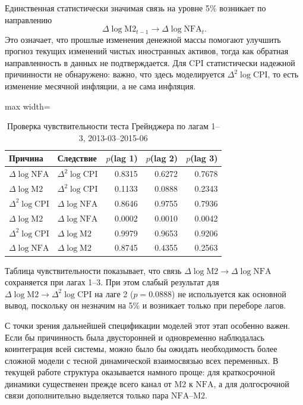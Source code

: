 \documentclass[12pt,a4paper]{article}
\begin{document}
Единственная статистически значимая связь на уровне 5\% возникает по направлению
\[
\Delta \log \mathrm{M2}_{t-1} \longrightarrow \Delta \log \mathrm{NFA}_t.
\]
Это означает, что прошлые изменения денежной массы помогают улучшить прогноз текущих
изменений чистых иностранных активов, тогда как обратная направленность в данных не
подтверждается. Для CPI статистически надежной причинности не обнаружено: важно, что здесь
моделируется $\Delta^2 \log \mathrm{CPI}$, то есть изменение месячной инфляции, а не сама
инфляция.

\begin{table}[H]
\centering
\caption{Проверка чувствительности теста Грейнджера по лагам 1--3, 2013-03--2015-06}
\small
\begin{adjustbox}{max width=\textwidth}
\begin{tabular}{llrrr}
\toprule
Причина & Следствие & $p$(lag 1) & $p$(lag 2) & $p$(lag 3) \\
\midrule
$\Delta \log \mathrm{NFA}$ & $\Delta^2 \log \mathrm{CPI}$ & 0.8315 & 0.6272 & 0.7678 \\
$\Delta \log \mathrm{M2}$ & $\Delta^2 \log \mathrm{CPI}$ & 0.1133 & 0.0888 & 0.2343 \\
$\Delta^2 \log \mathrm{CPI}$ & $\Delta \log \mathrm{NFA}$ & 0.8646 & 0.9755 & 0.7936 \\
$\Delta \log \mathrm{M2}$ & $\Delta \log \mathrm{NFA}$ & 0.0002 & 0.0010 & 0.0042 \\
$\Delta^2 \log \mathrm{CPI}$ & $\Delta \log \mathrm{M2}$ & 0.9979 & 0.9653 & 0.9206 \\
$\Delta \log \mathrm{NFA}$ & $\Delta \log \mathrm{M2}$ & 0.8745 & 0.4355 & 0.2563 \\
\bottomrule
\end{tabular}
\end{adjustbox}
\normalsize
\end{table}

Таблица чувствительности показывает, что связь $\Delta \log \mathrm{M2} \to \Delta \log
\mathrm{NFA}$ сохраняется при лагах 1--3. При этом слабый результат для $\Delta \log
\mathrm{M2} \to \Delta^2 \log \mathrm{CPI}$ на лаге 2 ($p=0.0888$) не используется как
основной вывод, поскольку он незначим на 5\% и возникает только при переборе лагов.

С точки зрения дальнейшей спецификации моделей этот этап особенно важен. Если бы причинность
была двусторонней и одновременно наблюдалась коинтеграция всей системы, можно было бы
ожидать необходимость более сложной модели с тесной динамической взаимосвязью всех
переменных. В текущей работе структура оказывается намного проще: для краткосрочной
динамики существенен прежде всего канал от $\mathrm{M2}$ к $\mathrm{NFA}$, а для долгосрочной связи
дополнительно выделяется только пара $\mathrm{NFA}$--$\mathrm{M2}$.
\end{document}
